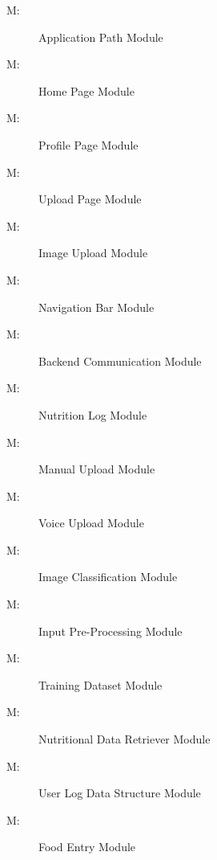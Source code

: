 \documentclass[12pt, titlepage]{article}
\newcounter{mnum}
\newcommand{\mthemnum}{M\themnum}
\begin{document}
\begin{description}
\item [ \mthemnum \label{mHH}:] Application Path Module
\item  [ \mthemnum \label{mHH}:] Home Page Module
\item  [ \mthemnum \label{mHH}:] Profile Page Module
\item  [ \mthemnum \label{mHH}:] Upload Page Module
\item  [ \mthemnum \label{mHH}:] Image Upload Module
\item  [ \mthemnum \label{mHH}:] Navigation Bar Module
\item  [ \mthemnum \label{mHH}:] Backend Communication Module
\item  [ \mthemnum \label{mHH}:] Nutrition Log Module
\item  [ \mthemnum \label{mHH}:] Manual Upload Module
\item  [ \mthemnum \label{mHH}:] Voice Upload Module
\item  [ \mthemnum \label{mHH}:] Image Classification Module
\item  [ \mthemnum \label{mHH}:] Input Pre-Processing Module
\item  [ \mthemnum \label{mHH}:] Training Dataset Module
\item  [ \mthemnum \label{mHH}:] Nutritional Data Retriever Module
\item  [ \mthemnum \label{mHH}:] User Log Data Structure Module
\item  [ \mthemnum \label{mHH}:] Food Entry Module
\end{description}
\end{document}
